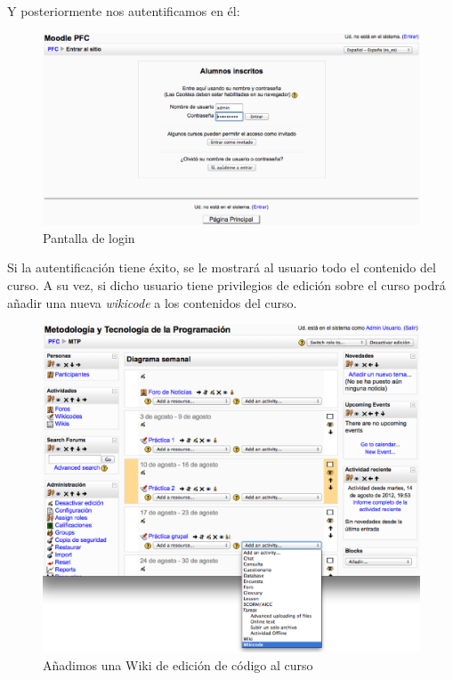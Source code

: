Y posteriormente nos autentificamos en él:

\begin{figure}[h]
	\label{login.eps}
	\includegraphics[width=\textwidth]{./img/login.eps}
	\caption{Pantalla de login}
\end{figure}

\newpage

Si la autentificación tiene éxito, se le mostrará al usuario todo el contenido del curso. A su vez, si dicho usuario tiene privilegios de edición sobre el curso podrá añadir una nueva \emph{wikicode} a los contenidos del curso.

\begin{figure}[h]
	\label{addwikicode.eps}
	\includegraphics[width=\textwidth]{./img/addwikicode.eps}
	\caption{Añadimos una Wiki de edición de código al curso}
\end{figure}


